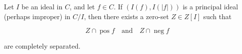 Let $I$ be an ideal in $C$, and let $f \in C$. If $(I(f), I(|f|))$ is a principal ideal (perhaps improper) in $C/I$, then there exists a zero-set $Z \in Z[I]$ such that

$$Z \cap \operatorname{pos} f \quad \text{and} \quad Z \cap \operatorname{neg} f$$

are completely separated.
